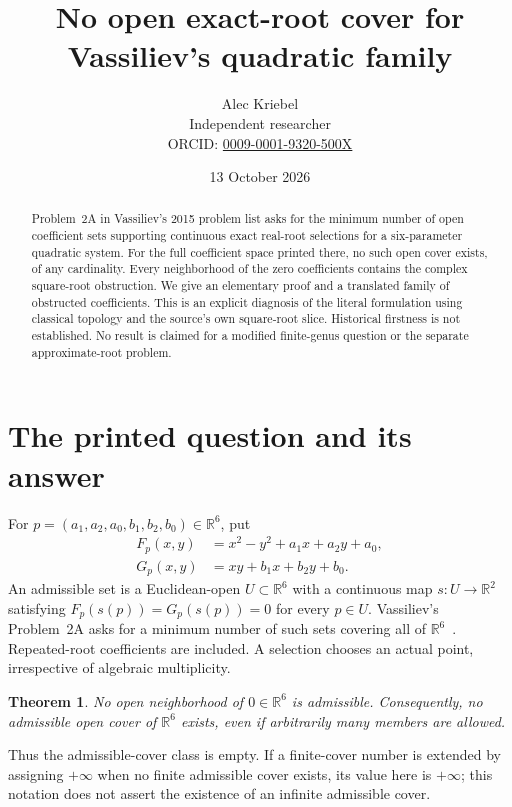 \documentclass[11pt]{article}
\title{No open exact-root cover for Vassiliev's quadratic family}
\author{Alec Kriebel\\
\small Independent researcher\\
\small ORCID: \href{https://orcid.org/0009-0001-9320-500X}{0009-0001-9320-500X}}
\date{13 October 2026}
\newtheorem{theorem}{Theorem}
\newcommand{\R}{\mathbb R}
\begin{document}
\maketitle
\begin{abstract}
Problem~2A in Vassiliev's 2015 problem list asks for the minimum number of
open coefficient sets supporting continuous exact real-root selections for
a six-parameter quadratic system. For the full coefficient space printed
there, no such open cover exists, of any cardinality. Every neighborhood
of the zero coefficients contains the complex square-root obstruction.
We give an elementary proof and a translated family of obstructed
coefficients. This is an explicit diagnosis of the literal formulation
using classical topology and the source's own square-root slice.
Historical firstness is not established. No result is claimed for a
modified finite-genus question or the separate approximate-root problem.
\end{abstract}

\section{The printed question and its answer}
For
\(p=(a_1,a_2,a_0,b_1,b_2,b_0)\in\R^6\), put
\begin{align}
 F_p(x,y)&=x^2-y^2+a_1x+a_2y+a_0,\label{eq:f}\\
 G_p(x,y)&=xy+b_1x+b_2y+b_0.\label{eq:g}
\end{align}
An admissible set is a Euclidean-open \(U\subset\R^6\) with a continuous
map \(s:U\to\R^2\) satisfying \(F_p(s(p))=G_p(s(p))=0\) for every \(p\in U\).
Vassiliev's Problem~2A asks for a minimum number of such sets covering
all of \(\R^6\)~\cite[Section~2, p.~205]{V15}. Repeated-root coefficients
are included. A selection chooses an actual point, irrespective of
algebraic multiplicity.

\begin{theorem}\label{thm:main}
No open neighborhood of \(0\in\R^6\) is admissible.
Consequently, no admissible open cover of \(\R^6\) exists, even if
arbitrarily many members are allowed.
\end{theorem}
Thus the admissible-cover class is empty. If a finite-cover number is
extended by assigning \(+\infty\) when no finite admissible cover exists,
its value here is \(+\infty\); this notation does not assert the existence
of an infinite admissible cover.
\end{document}
